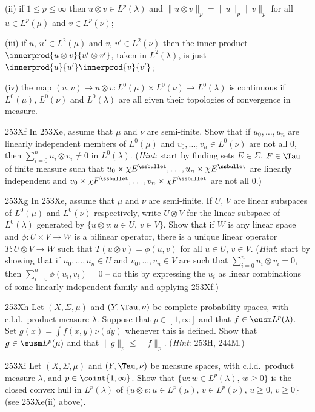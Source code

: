 {\quad (ii) if $1\le p\le\infty$ then $u\otimes v\in L^p(\lambda)$ and
$\|u\otimes v\|_p=\|u\|_p\|v\|_p$ for all $u\in L^p(\mu)$ and
$v\in L^p(\nu)$;

\quad (iii) if $u$, $u'\in L^2(\mu)$ and $v$, $v'\in L^2(\nu)$ then the
inner product $\innerprod{u\otimes v}{u'\otimes v'}$, taken in
$L^2(\lambda)$, is just $\innerprod{u}{u'}\innerprod{v}{v'}$;

\quad (iv) the map
$(u,v)\mapsto u\otimes v:L^0(\mu)\times L^0(\nu)\to L^0(\lambda)$
is continuous if $L^0(\mu)$, $L^0(\nu)$ and $L^0(\lambda)$
are all given their topologies of convergence in measure.

\spheader 253Xf In 253Xe, assume that $\mu$ and $\nu$ are semi-finite.
Show that if $u_0,\ldots,u_n$ are linearly independent members of
$L^0(\mu)$ and $v_0,\ldots,v_n\in L^0(\nu)$ are not all $0$, then
$\sum_{i=0}^nu_i\otimes v_i\ne 0$ in $L^0(\lambda)$.   ({\it Hint\/}:
start by finding sets $E\in\Sigma$, $F\in\Tau$ of finite measure such
that $u_0\times\chi E^{\ssbullet},\ldots,u_n\times\chi E^{\ssbullet}$
are linearly independent and
$v_0\times\chi F^{\ssbullet},\ldots,v_n\times\chi F^{\ssbullet}$
are not all $0$.)

\spheader 253Xg In 253Xe, assume that $\mu$ and $\nu$ are semi-finite.
If $U$, $V$ are linear subspaces of $L^0(\mu)$ and $L^0(\nu)$
respectively, write $U\otimes V$ for the linear subspace of
$L^0(\lambda)$ generated by $\{u\otimes v:u\in U,\,v\in V\}$.
Show that if $W$ is any linear space and $\phi:U\times V\to W$ is a
bilinear operator, there is a unique linear operator $T:U\otimes V\to W$
such that $T(u\otimes v)=\phi(u,v)$ for all $u\in U$, $v\in V$.
({\it Hint\/}: start by showing that if $u_0,\ldots,u_n\in U$ and
$v_0,\ldots,v_n\in V$ are such that $\sum_{i=0}^nu_i\otimes v_i=0$, then
$\sum_{i=0}^n\phi(u_i,v_i)=0$ -- do this by expressing the $u_i$ as
linear combinations of some linearly independent family and applying
253Xf.)

\sqheader 253Xh Let $(X,\Sigma,\mu)$ and $(Y,\Tau,\nu)$ be complete
probability spaces, with c.l.d.\ product measure $\lambda$.   Suppose
that $p\in[1,\infty]$ and that $f\in\eusm L^p(\lambda)$.   Set
$g(x)=\int f(x,y)\nu(dy)$ whenever this is defined.   Show that
$g\in\eusm L^p(\mu)$ and that $\|g\|_p\le\|f\|_p$.   ({\it Hint\/}:  253H,
244M.)

\spheader 253Xi Let $(X,\Sigma,\mu)$ and $(Y,\Tau,\nu)$ be measure
spaces, with c.l.d.\ product measure $\lambda$, and
$p\in\coint{1,\infty}$.   Show that $\{w:w\in L^p(\lambda),\,w\ge 0\}$
is the closed convex hull in $L^p(\lambda)$ of
$\{u\otimes v:u\in L^p(\mu),\,v\in L^p(\nu),\,u\ge 0,\,v\ge 0\}$
(see 253Xe(ii) above).

}
